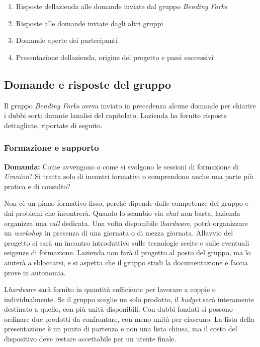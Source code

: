 \documentclass[12pt,a4paper]{article}
\newcommand{\tightlist}{\setlength{\itemsep}{1pt}\setlength{\parskip}{0pt}}
\begin{document}
\begin{enumerate}
\def\labelenumi{\arabic{enumi}.}
\tightlist
\item
  Risposte dell\textquotesingle azienda alle domande inviate dal gruppo \emph{Bending Forks}
\item
  Risposte alle domande inviate dagli altri gruppi
\item
  Domande aperte dei partecipanti
\item
  Presentazione dell\textquotesingle azienda, origine del progetto e passi successivi
\end{enumerate}

\hypertarget{domande-e-risposte-del-gruppo}{%
\subsection{Domande e risposte del gruppo}}

Il gruppo \emph{Bending Forks} aveva inviato in precedenza alcune domande per chiarire i dubbi sorti durante l\textquotesingle analisi del capitolato. L\textquotesingle azienda ha fornito risposte dettagliate, riportate di seguito.

\hypertarget{formazione-e-supporto}{%
\subsubsection{Formazione e supporto}}

\textbf{Domanda:} Come avvengono o come si svolgono le sessioni di formazione di \emph{Uranion}? Si tratta solo di incontri formativi o comprendono anche una parte più pratica e di consulto?

Non c\textquotesingle è un piano formativo fisso, perché dipende dalle competenze del gruppo e dai problemi che incontrerà. Quando lo scambio via \emph{chat} non basta, l\textquotesingle azienda organizza una \emph{call} dedicata. Una volta disponibile l\textquotesingle{}\emph{hardware}, potrà organizzare un \emph{workshop} in presenza di una giornata o di mezza giornata. All\textquotesingle avvio del progetto ci sarà un incontro introduttivo sulle tecnologie scelte e sulle eventuali esigenze di formazione. L\textquotesingle azienda non farà il progetto al posto del gruppo, ma lo aiuterà a sbloccarsi, e si aspetta che il gruppo studi la documentazione e faccia prove in autonomia.

L\textquotesingle{}\emph{hardware} sarà fornito in quantità sufficiente per lavorare a coppie o individualmente. Se il gruppo sceglie un solo prodotto, il \emph{budget} sarà interamente destinato a quello, con più unità disponibili. Con dubbi fondati si possono ordinare due prodotti da confrontare, con meno unità per ciascuno. La lista della presentazione è un punto di partenza e non una lista chiusa, ma il costo del dispositivo deve restare accettabile per un utente finale.
\end{document}
